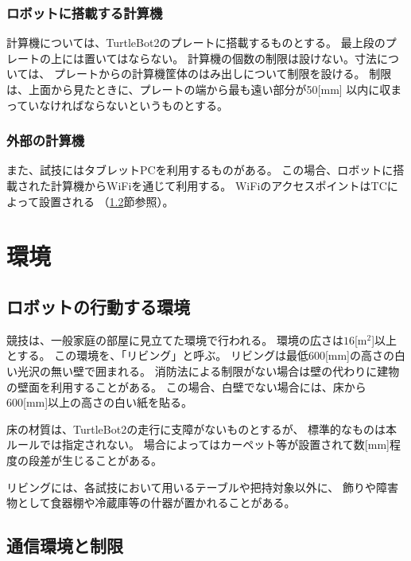 \documentclass[a4j]{jarticle}
\begin{document}
\subsubsection{ロボットに搭載する計算機}

計算機については、TurtleBot2のプレートに搭載するものとする。
最上段のプレートの上には置いてはならない。
計算機の個数の制限は設けない。寸法については、
プレートからの計算機筐体のはみ出しについて制限を設ける。
制限は、上面から見たときに、プレートの端から最も遠い部分が50[mm]
以内に収まっていなければならないというものとする。

\subsubsection{外部の計算機}

また、試技にはタブレットPCを利用するものがある。
この場合、ロボットに搭載された計算機からWiFiを通じて利用する。
WiFiのアクセスポイントはTCによって設置される
（\ref{sub:network}節参照）。

\section{環境}

\subsection{ロボットの行動する環境}\label{sub:environment}


競技は、一般家庭の部屋に見立てた環境で行われる。
環境の広さは$16$[m$^2$]以上とする。
この環境を、「リビング」と呼ぶ。
リビングは最低600[mm]の高さの白い光沢の無い壁で囲まれる。
消防法による制限がない場合は壁の代わりに建物の壁面を利用することがある。
この場合、白壁でない場合には、床から600[mm]以上の高さの白い紙を貼る。

床の材質は、TurtleBot2の走行に支障がないものとするが、
標準的なものは本ルールでは指定されない。
場合によってはカーペット等が設置されて数[mm]程度の段差が生じることがある。

リビングには、各試技において用いるテーブルや把持対象以外に、
飾りや障害物として食器棚や冷蔵庫等の什器が置かれることがある。

\subsection{通信環境と制限}\label{sub:network}
\end{document}

